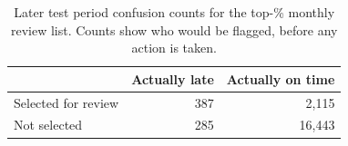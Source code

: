 \begin{table}[H]
\centering\small
\caption{Later test period confusion counts for the top-\ActShare{}\% monthly review list. Counts show who would be flagged, before any action is taken.}
\label{tab:app-confusion}
\begin{tabular}{@{}lrr@{}}
\toprule
& Actually late & Actually on time \\
\midrule
Selected for review & 387 & 2,115 \\
Not selected & 285 & 16,443 \\
\bottomrule
\end{tabular}
\end{table}